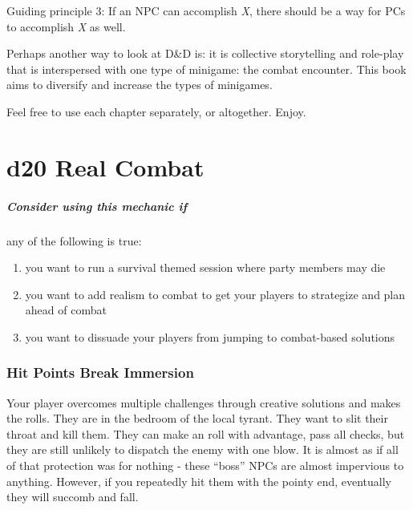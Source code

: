 \documentclass[twocolumn]{dndbook}
\begin{document}
\begin{emphasisParagraph}
	Guiding principle 3: If an NPC can accomplish \emph{X}, there should be a way for PCs to accomplish \emph{X} as well.
\end{emphasisParagraph}

Perhaps another way to look at D\&D is: it is collective storytelling and
role-play that is interspersed with one type of minigame: the combat encounter.
This book aims to diversify and increase the types of minigames.

Feel free to use each chapter separately, or altogether. Enjoy.




\chapter{d20 Real Combat}
\label{chap:d20_real_combat}

\begin{emphasisParagraph}
	\paragraph*{Consider using this mechanic if} any of the following is true:
	\begin{enumerate}
		\item you want to run a survival themed session where party members may die
		\item you want to add realism to combat to get your players to strategize and plan ahead of combat
		\item you want to dissuade your players from jumping to combat-based solutions
	\end{enumerate}
\end{emphasisParagraph}


\subsection{Hit Points Break Immersion}

Your player overcomes multiple challenges through creative solutions and makes the rolls.
They are in the bedroom of the local tyrant. They want to slit their throat and kill them.
They can make an roll with advantage, pass all checks, but they are still unlikely to dispatch the enemy with one blow.
It is almost as if all of that protection was for nothing - these ``boss'' NPCs are almost impervious to anything.
However, if you repeatedly hit them with the pointy end, eventually they will succomb and fall.\par
\end{document}

